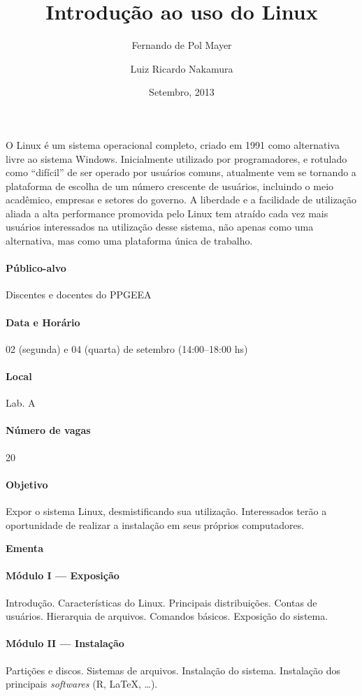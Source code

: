 \documentclass[a4paper,12pt]{article}
\title{Introdução ao uso do Linux}
\author{Fernando de Pol Mayer \and Luiz Ricardo Nakamura}
\date{Setembro, 2013}
\providecommand{\R}{\textsf{R}\xspace}
\begin{document}
\maketitle
\thispagestyle{empty}

O Linux é um sistema operacional completo, criado em 1991 como
alternativa livre ao sistema Windows. Inicialmente utilizado por
programadores, e rotulado como ``difícil'' de ser operado por usuários
comuns, atualmente vem se tornando a plataforma de escolha de um número
crescente de usuários, incluindo o meio acadêmico, empresas e setores do
governo. A liberdade e a facilidade de utilização aliada a alta
performance promovida pelo Linux tem atraído cada vez mais usuários
interessados na utilização desse sistema, não apenas como uma
alternativa, mas como uma plataforma única de trabalho.

\paragraph{Público-alvo} Discentes e docentes do PPGEEA

\paragraph{Data e Horário} 02 (segunda) e 04 (quarta) de setembro (14:00--18:00 hs)

\paragraph{Local} Lab. A

\paragraph{Número de vagas} 20

\paragraph{Objetivo} Expor o sistema Linux, desmistificando sua
utilização. Interessados terão a oportunidade de realizar a instalação
em seus próprios computadores.

\begin{center}
  \textbf{Ementa}
\end{center}

\paragraph{Módulo I --- Exposição} Introdução. Características do
Linux. Principais distribuições. Contas de usuários. Hierarquia de
arquivos. Comandos básicos. Exposição do sistema.

\paragraph{Módulo II --- Instalação} Partições e discos. Sistemas de
arquivos. Instalação do sistema. Instalação dos principais
\textit{softwares} (\R, \LaTeX, \ldots).
\end{document}
